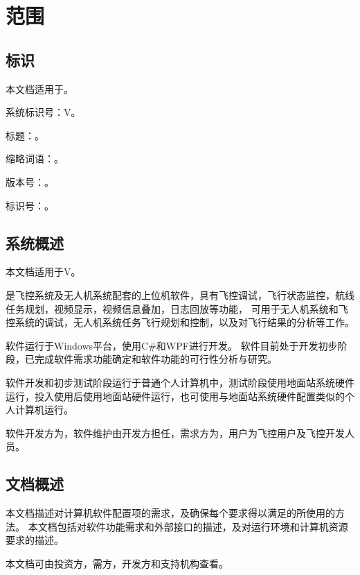 
\section{范围}
\subsection{标识}
本文档适用于\csciname。

系统标识号：\csciname V\csciver。

标题：\csciname。

缩略词语：\csciabbr。

版本号：\csciver。

标识号：\csciver。

\subsection{系统概述}
本文档适用于\csciname V\csciver。

\csciname 是\cscidem 飞控系统及无人机系统配套的上位机软件，具有飞控调试，飞行状态监控，航线任务规划，视频显示，视频信息叠加，日志回放等功能，
可用于无人机系统和飞控系统的调试，无人机系统任务飞行规划和控制，以及对飞行结果的分析等工作。

软件运行于Windows平台，使用C\#和WPF进行开发。
软件目前处于开发初步阶段，已完成软件需求功能确定和软件功能的可行性分析与研究。

软件开发和初步测试阶段运行于普通个人计算机中，测试阶段使用地面站系统硬件运行，投入使用后使用地面站硬件运行，也可使用与地面站系统硬件配置类似的个人计算机运行。

软件开发方为\cscidev，软件维护由开发方担任，需求方为\cscidem，用户为\cscidem 飞控用户及飞控开发人员。


\subsection{文档概述}
本文档描述对计算机软件配置项的需求，及确保每个要求得以满足的所使用的方法。
本文档包括对软件功能需求和外部接口的描述，及对运行环境和计算机资源要求的描述。

本文档可由投资方，需方，开发方和支持机构查看。

\clearpage
\endinput
